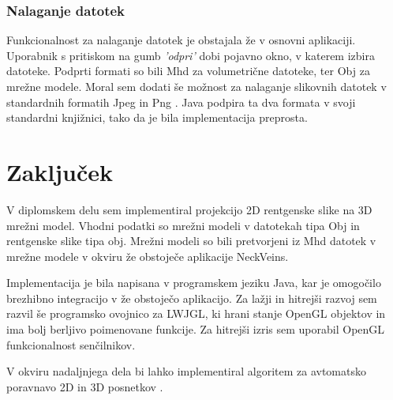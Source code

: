 \documentclass[a4paper, 12pt]{book}
\begin{document}
\subsection{Nalaganje datotek}
Funkcionalnost za nalaganje datotek je obstajala že v osnovni aplikaciji. Uporabnik s pritiskom na gumb \emph{'odpri'} dobi pojavno okno, v katerem izbira datoteke. Podprti formati so bili Mhd za volumetrične datoteke, ter Obj za mrežne modele. Moral sem dodati še možnost za nalaganje slikovnih datotek v standardnih formatih Jpeg in Png \cite{png}. Java podpira ta dva formata v svoji standardni knjižnici, tako da je bila implementacija preprosta.

\chapter{Zaključek}
V diplomskem delu sem implementiral projekcijo 2D rentgenske slike na 3D mrežni model. Vhodni podatki so mrežni modeli v datotekah tipa Obj in rentgenske slike tipa obj. Mrežni modeli so bili pretvorjeni iz Mhd datotek v mrežne modele v okviru že obstoječe aplikacije NeckVeins.

Implementacija je bila napisana v programskem jeziku Java, kar je omogočilo brezhibno integracijo v že obstoječo aplikacijo. Za lažji in hitrejši razvoj sem razvil še programsko ovojnico za LWJGL, ki hrani stanje OpenGL objektov in ima bolj berljivo poimenovane funkcije. Za hitrejši izris sem uporabil OpenGL funkcionalnost senčilnikov.

V okviru nadaljnjega dela bi lahko implementiral algoritem za avtomatsko poravnavo 2D in 3D posnetkov \cite{6507588}.



\end{document}
